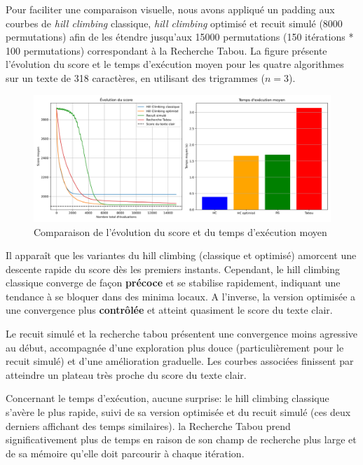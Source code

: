 \documentclass[a4paper]{article}
\begin{document}
Pour faciliter une comparaison visuelle, nous avons appliqué un padding aux courbes de \textit{hill climbing} classique, \textit{hill climbing} optimisé et recuit simulé (8000 permutations) afin de les étendre jusqu'aux 15000 permutations 
(150 itérations * 100 permutations) correspondant à la Recherche Tabou. La figure présente l'évolution du score et le temps d'exécution moyen pour les quatre algorithmes sur un texte de 318 caractères, en utilisant des trigrammes ($n=3$).

\begin{figure}[H]
    \centering
    \includegraphics[width=\textwidth, keepaspectratio, height=\textheight]{comparaison_algorithmes_et_temps.png}
    \caption{Comparaison de l'évolution du score et du temps d'exécution moyen}
    \label{fig:score-temps}
\end{figure}

Il apparaît que les variantes du hill climbing (classique et optimisé) amorcent une descente rapide du score dès les premiers instants. Cependant, le hill climbing classique converge de façon \textbf{précoce} et se stabilise rapidement, indiquant une tendance à se bloquer dans des minima locaux. 
A l'inverse, la version optimisée a une convergence plus \textbf{contrôlée} et atteint quasiment le score du texte clair.

Le recuit simulé et la recherche tabou présentent une convergence moins agressive au début, accompagnée d'une exploration plus douce (particulièrement pour le recuit simulé) et d'une amélioration graduelle. Les courbes associées finissent par atteindre un plateau très proche du score du texte clair.


Concernant le temps d'exécution, aucune surprise: le hill climbing classique s'avère le plus rapide, suivi de sa version optimisée et du recuit simulé (ces deux derniers affichant des temps similaires). la Recherche Tabou prend significativement plus de temps en raison de son champ de recherche plus large
et de sa mémoire qu'elle doit parcourir à chaque itération.
\end{document}
